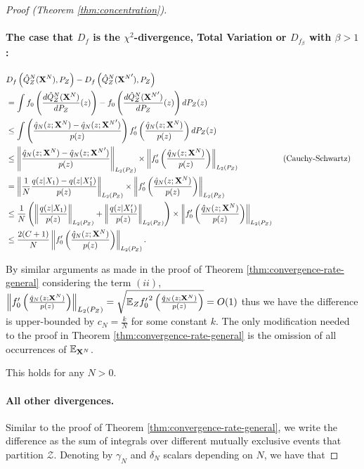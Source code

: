 \begin{proof}[Proof (Theorem \ref{thm:concentration})]
\paragraph{The case that $D_f$ is the $\chi^2$-divergence, Total Variation or $D_{f_\beta}$ with $\beta>1$:}
\begin{align*}
    & D_f\left( \hat{Q}_Z^N(\mathbf{X}^N) , P_Z\right) - D_f\left( \hat{Q}_Z^N({\mathbf{X}^N}') , P_Z\right)  \\
    &= \int f_0\left( \frac{d\hat{Q}_Z^N(\mathbf{X}^N)}{dP_Z}(z) \right) - f_0\left( \frac{d\hat{Q}_Z^N({\mathbf{X}^N}')}{dP_Z}(z) \right) dP_Z(z)  \\
    &\leq \int \left( \frac{\hat{q}_N(z;\mathbf{X}^N) - \hat{q}_N(z;{\mathbf{X}^N}')}{p(z)} \right)     f'_0\left(\frac{\hat{q}_N(z;\mathbf{X}^N)}{p(z)} \right) dP_Z(z)  \\
    &\leq \left\| \frac{\hat{q}_N(z;\mathbf{X}^N) - \hat{q}_N(z;{\mathbf{X}^N}')}{p(z)} \right\|_{L_2(P_Z)} \times \left\| f'_0\left(\frac{\hat{q}_N(z;\mathbf{X}^N)}{p(z)}\right) \right\|_{L_2(P_Z)}
    && \text{ (Cauchy-Schwartz)}\\
    &= \left\| \frac{1}{N} \frac{q(z|X_1) - q(z|X'_1)}{p(z)} \right\|_{L_2(P_Z)} \times \left\| f'_0\left(\frac{\hat{q}_N(z;\mathbf{X}^N)}{p(z)}\right) \right\|_{L_2(P_Z)} \\
    &\leq \frac{1}{N} \left( \left\| \frac{q(z|X_1)}{p(z)}\right\|_{L_2(P_Z)} + \left\|\frac{q(z|X'_1)}{p(z)} \right\|_{L_2(P_Z)} \right)\times \left\| f'_0\left(\frac{\hat{q}_N(z;\mathbf{X}^N)}{p(z)}\right) \right\|_{L_2(P_Z)} \\
    &\leq \frac{2(C+1)}{N} \left\| f'_0\left(\frac{\hat{q}_N(z;\mathbf{X}^N)}{p(z)}\right) \right\|_{L_2(P_Z)}.
\end{align*}

By similar arguments as made in the proof of Theorem \ref{thm:convergence-rate-general} considering the term $(ii)$, $\left\| f_0'\left(\frac{\hat{q}_N(z;\mathbf{X}^N)}{p(z)}\right) \right\|_{L_2(P_Z)} = \sqrt{\mathbb{E}_Z {f'_0}^2\left(\frac{\hat{q}_N(z;\mathbf{X}^N)}{p(z)}\right)} = O(1)$ thus we have the difference is upper-bounded by $c_N = \frac{k}{N}$ for some constant $k$.
The only modification needed to the proof in Theorem \ref{thm:convergence-rate-general} is the omission of all occurrences of $\mathbb{E}_{\mathbf{X}^N}$.

This holds for any $N>0$.

\paragraph{All other divergences.}

Similar to the proof of Theorem \ref{thm:convergence-rate-general},
we write the difference as the sum of integrals over different mutually exclusive events that partition $\mathcal{Z}$.
Denoting by $\gamma_N$ and $\delta_N$ scalars depending on $N$, we have that


\end{proof}
